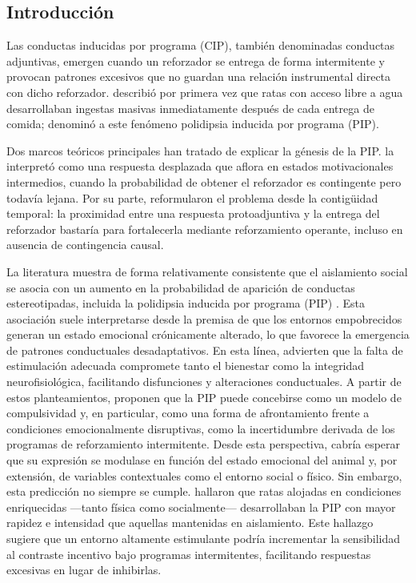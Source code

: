 \documentclass[12pt,a4paper]{article}
\begin{document}
\begin{multicols}{2}

\section{Introducción}

Las conductas inducidas por programa (CIP), también denominadas conductas adjuntivas, emergen cuando un reforzador se entrega de forma intermitente y provocan patrones excesivos que no guardan una relación instrumental directa con dicho reforzador. \citet{Falk1961} describió por primera vez que ratas con acceso libre a agua desarrollaban ingestas masivas inmediatamente después de cada entrega de comida; denominó a este fenómeno polidipsia inducida por programa (PIP).

Dos marcos teóricos principales han tratado de explicar la génesis de la PIP. \citet{Staddon1977} la interpretó como una respuesta desplazada que aflora en estados motivacionales intermedios, cuando la probabilidad de obtener el reforzador es contingente pero todavía lejana. Por su parte, \citet{Killeen2013} reformularon el problema desde la contigüidad temporal: la proximidad entre una respuesta protoadjuntiva y la entrega del reforzador bastaría para fortalecerla mediante reforzamiento operante, incluso en ausencia de contingencia causal.

La literatura muestra de forma relativamente consistente que el aislamiento social se asocia con un aumento en la probabilidad de aparición de conductas estereotipadas, incluida la polidipsia inducida por programa (PIP) \citep{Jones1989,ibias2016effects,wang2024social,GROSS201261}. Esta asociación suele interpretarse desde la premisa de que los entornos empobrecidos generan un estado emocional crónicamente alterado, lo que favorece la emergencia de patrones conductuales desadaptativos. En esta línea, \citet{GarciaRebollar2024} advierten que la falta de estimulación adecuada compromete tanto el bienestar como la integridad neurofisiológica, facilitando disfunciones y alteraciones conductuales. A partir de estos planteamientos, \citet{Moreno2012} proponen que la PIP puede concebirse como un modelo de compulsividad y, en particular, como una forma de afrontamiento frente a condiciones emocionalmente disruptivas, como la incertidumbre derivada de los programas de reforzamiento intermitente. Desde esta perspectiva, cabría esperar que su expresión se modulase en función del estado emocional del animal y, por extensión, de variables contextuales como el entorno social o físico. Sin embargo, esta predicción no siempre se cumple. \citet{FuentesVerdugo2023} hallaron que ratas alojadas en condiciones enriquecidas —tanto física como socialmente— desarrollaban la PIP con mayor rapidez e intensidad que aquellas mantenidas en aislamiento. Este hallazgo sugiere que un entorno altamente estimulante podría incrementar la sensibilidad al contraste incentivo bajo programas intermitentes, facilitando respuestas excesivas en lugar de inhibirlas.


\end{multicols}
\end{document}
